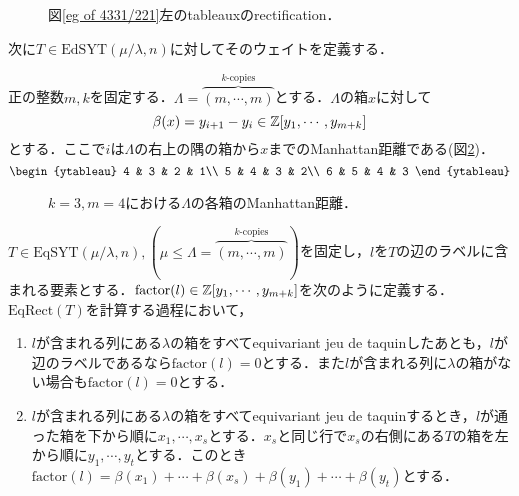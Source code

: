 \begin{eg}
\begin{figure}[H]
    \caption{図\ref{eg of 4331/221}左のtableauxのrectification．}\label{rect of 4331/221}
  \end{figure}
  \end{eg}

次に$T\in\text{EdSYT}(\mu/\lambda, n)$に対してそのウェイトを定義する．

\begin{defin}
  正の整数$m, k$を固定する．$\Lambda=\overbrace{(m,\cdots,m)}^{k\text{-copies}}$とする．$\Lambda$の箱$x$に対して
  \[
  \beta(x)=y_{i+1}-y_i\in \mathbb{Z}[y_1,\cdots,y_{m+k}]
  \]
  とする．ここで$i$は$\Lambda$の右上の隅の箱から$x$までのManhattan距離である(図\ref{manhattan})．
  \[
  \begin{ytableau}
    4 & 3 & 2 & 1\\
    5 & 4 & 3 & 2\\
    6 & 5 & 4 & 3
  \end{ytableau}
  \]
  \begin{figure}[H]
    \centering
    \caption{$k=3,m=4$における$\Lambda$の各箱のManhattan距離．}\label{manhattan}
  \end{figure}
\end{defin}

\begin{defin}
  $T\in\text{EqSYT}(\mu/\lambda, n), (\mu\leq\Lambda=\overbrace{(m,\cdots,m)}^{k\text{-copies}})$を固定し，$l$を$T$の辺のラベルに含まれる要素とする．$\text{factor}(l)\in\mathbb{Z}[y_1,\cdots,y_{m+k}]$を次のように定義する．$\text{EqRect}(T)$を計算する過程において，
  \begin{enumerate}
    \item $l$が含まれる列にある$\lambda$の箱をすべてequivariant jeu de taquinしたあとも，$l$が辺のラベルであるなら$\text{factor}(l)=0$とする．また$l$が含まれる列に$\lambda$の箱がない場合も$\text{factor}(l)=0$とする．
    \item $l$が含まれる列にある$\lambda$の箱をすべてequivariant jeu de taquinするとき，$l$が通った箱を下から順に$x_1,\cdots,x_s$とする．$x_s$と同じ行で$x_s$の右側にある$T$の箱を左から順に$y_1,\cdots,y_t$とする．このとき$\text{factor}(l)=\beta(x_1)+\cdots+\beta(x_s)+\beta(y_1)+\cdots+\beta(y_t)$とする．
  \end{enumerate}
\end{defin}

